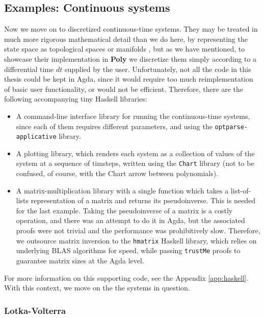 \subsection{Examples: Continuous systems}
Now we move on to discretized continuous-time systems. They may be treated in much more rigorous mathematical detail than we do here, by representing the state space as topological spaces or manifolds \cite{css}, but as we have mentioned, to showcase their implementation in \textbf{Poly} we discretize them simply according to a differential time $dt$ supplied by the user.
Unfortunately, not all the code in this thesis could be kept in Agda, since it would require too much reimplementation of basic user functionality, or would not be efficient. Therefore, there are the following accompanying tiny Haskell libraries:
\begin{itemize}
    \item A command-line interface library for running the continuous-time systems, since each of them requires different parameters, and using the \texttt{optparse-applicative} \cite{optparse} library.
    \item A plotting library, which renders each system as a collection of values of the system at a sequence of timsteps, written using the \texttt{Chart} \cite{chart-lib} library (not to be confused, of course, with the Chart arrow between polynomials).
    \item A matrix-multiplication library with a single function which takes a list-of-lists representation of a matrix and returns its pseudoinverse. This is needed for the last example. Taking the pseudoinverse of a matrix is a costly operation, and there was an attempt to do it in Agda, but the associated proofs were not trivial and the performance was prohibitively slow. Therefore, we outsource matrix inversion to the \texttt{hmatrix} \cite{hmatrix} Haskell library, which relies on underlying BLAS \cite{blas} algorithms for speed, while passing \texttt{trustMe} proofs to guarantee matrix sizes at the Agda level.
\end{itemize}
For more information on this supporting code, see the Appendix \ref{app:haskell}.
With this context, we move on the the systems in question.

\subsubsection{Lotka-Volterra}

